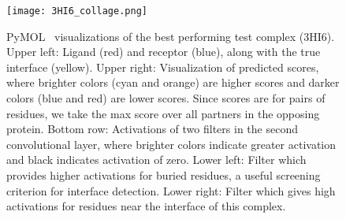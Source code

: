 \begin{figure}
	\texttt{[image: 3HI6\_collage.png]}
	\caption{PyMOL~\cite{schrodinger2015} visualizations of the best performing test complex (3HI6). Upper left: Ligand (red) and receptor (blue), along with the true interface (yellow). Upper right: Visualization of predicted scores, where brighter colors (cyan and orange) are higher scores and darker colors (blue and red) are lower scores. Since scores are for pairs of residues, we take the max score over all partners in the opposing protein. Bottom row: Activations of two filters in the second convolutional layer, where brighter colors indicate greater activation and black indicates activation of zero. Lower left: Filter which provides higher activations for buried residues, a useful screening criterion for interface detection. Lower right: Filter which gives high activations for residues near the interface of this complex.
		\label{fig:filter_vis}}
\end{figure}

